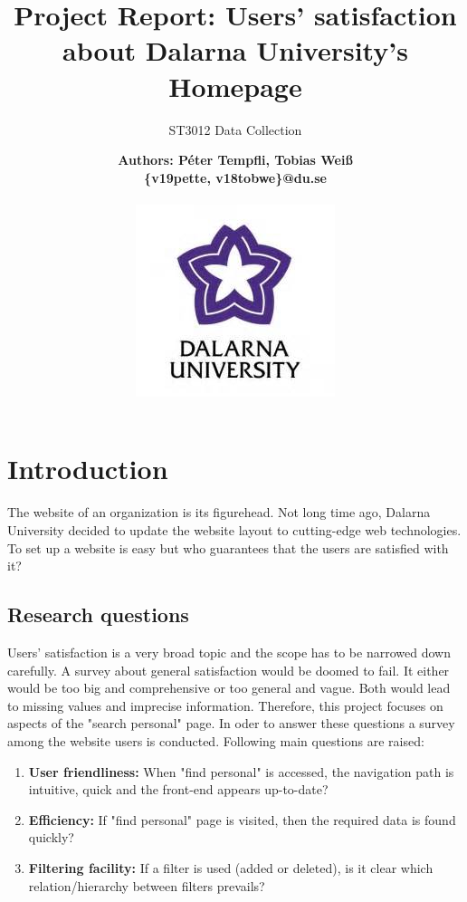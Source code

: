 \documentclass[12pt,a4paper,paper=a4,oneside,titlepage,pdftex]{scrartcl}
\begin{document}
	

\title{Project Report: Users' satisfaction about Dalarna University's Homepage}
\subtitle{ST3012 Data Collection}
\author{
	\bfseries\Large Authors: Péter Tempfli, Tobias Weiß\\
	\{v19pette, v18tobwe\}@du.se
	\\ \\
	\includegraphics[]{figures/du-logo.jpg}\\
}

\maketitle
\tableofcontents
\newpage

\section{Introduction}
The website of an organization is its figurehead. Not long time ago, Dalarna University decided to update the website layout to cutting-edge web technologies. To set up a website is easy but who guarantees that the users are satisfied with it?

\subsection{Research questions}
Users' satisfaction is a very broad topic and the scope has to be narrowed down carefully. A survey about general satisfaction would be doomed to fail. It either would be too big and comprehensive or too general and vague. Both would lead to missing values and imprecise information. Therefore, this project focuses on aspects of the "search personal" page. In oder to answer these questions a survey among the website users is conducted. Following main questions are raised:

\begin{enumerate}
	\item \textbf{User friendliness:} When "find personal" is accessed, the navigation path is intuitive, quick and the front-end appears up-to-date?
	\item \textbf{Efficiency:} If "find personal" page is visited, then the required data is found quickly?
	\item \textbf{Filtering facility:} If a filter is used (added or deleted), is it clear which relation/hierarchy between filters prevails?
\end{enumerate}
\end{document}
